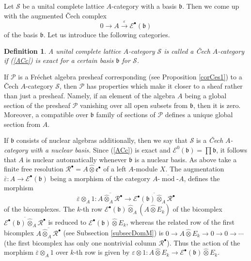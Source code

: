 \documentclass[12pt]{amsart}%
\theoremstyle{plain}
\newtheorem{definition}{Definition}
\numberwithin{equation}{section}
\numberwithin{equation}{section}
\numberwithin{theorem}{section}
\numberwithin{lemma}{section}
\numberwithin{remark}{section}
\numberwithin{example}{section}
\numberwithin{proposition}{section}
\numberwithin{definition}{section}
\numberwithin{corollary}{section}
\begin{document}
Let $\mathcal{S}$ be a unital complete lattice $A$-category with a basis
$\mathfrak{b}$. Then we come up with the augmented \v{C}ech complex
\begin{equation}
0\rightarrow A\overset{\varepsilon}{\longrightarrow}\mathcal{E}^{\bullet
}\left(  \mathfrak{b}\right)  \label{ACc}%
\end{equation}
of the basis $\mathfrak{b}$. Let us introduce the following categories.

\begin{definition}
\label{defCech}A unital complete lattice $A$-category $\mathcal{S}$ is called
\textit{a \v{C}ech }$A$-\textit{category if (\ref{ACc}) is exact for a certain
}basis $\mathfrak{b}$ for $\mathcal{S}$.
\end{definition}

If $\mathcal{P}$ is a Fr\'{e}chet algebra presheaf corresponding (see
Proposition \ref{corCes1}) to a \v{C}ech $A$-category $\mathcal{S}$, then
$\mathcal{P}$ has properties which make it closer to a sheaf rather than just
a presheaf. Namely, if an element of the algebra $A$ being a global section of
the presheaf $\mathcal{P}$ vanishing over all open subsets from $\mathfrak{b}%
$, then it is zero. Moreover, a compatible over $\mathfrak{b}$ family of
sections of $\mathcal{P}$ defines a unique global section from $A$.

If $\mathfrak{b}$ consists of nuclear algebras additionally, then we say that
$\mathcal{S}$ is a\textit{ \v{C}ech }$A$\textit{-category with a nuclear
basis. }Since (\ref{ACc}) is exact and $\mathcal{E}^{0}\left(  \mathfrak{b}%
\right)  =\prod\mathfrak{b}$, it follows that $A$ is nuclear automatically
whenever $\mathfrak{b}$ is a nuclear basis. As above take a finite free
resolution $\mathcal{R}^{\bullet}\mathcal{=}A\widehat{\otimes}\mathfrak{e}%
^{\bullet}$ of a left $A$-module $X$. The augmentation $\overline{\varepsilon
}:A\rightarrow\mathcal{E}^{\bullet}\left(  \mathfrak{b}\right)  $ being a
morphism of the category $\overline{A\text{-}\operatorname*{mod}\text{-}A}$,
defines the morphism
\begin{equation}
\overline{\varepsilon}\otimes_{A}1:\overline{A\widehat{\otimes}_{A}%
\mathcal{R}^{\bullet}}\longrightarrow\overline{\mathcal{E}^{\bullet}\left(
\mathfrak{b}\right)  \widehat{\otimes}_{A}\mathcal{R}^{\bullet}} \label{Epst1}%
\end{equation}
of the bicomplexes. The $k$-th row $\mathcal{E}^{\bullet}\left(
\mathfrak{b}\right)  \widehat{\otimes}_{A}\left(  A\widehat{\otimes}%
E_{k}\right)  $ of the bicomplex $\overline{\mathcal{E}^{\bullet}\left(
\mathfrak{b}\right)  \widehat{\otimes}_{A}\mathcal{R}^{\bullet}}$ is reduced
to $\mathcal{E}^{\bullet}\left(  \mathfrak{b}\right)  \widehat{\otimes}E_{k}$,
whereas the related row of the first bicomplex $\overline{A\widehat{\otimes
}_{A}\mathcal{R}^{\bullet}}$ (see Subsection \ref{subsecDomM}) is
$0\rightarrow A\widehat{\otimes}E_{k}\rightarrow0\rightarrow0\rightarrow
\cdots$ (the first bicomplex has only one nontrivial column $\mathcal{R}%
^{\bullet}$). Thus the action of the morphism $\overline{\varepsilon}%
\otimes_{A}1$ over $k$-th row is given by $\varepsilon\otimes
1:A\widehat{\otimes}E_{k}\rightarrow\mathcal{E}^{\bullet}\left(
\mathfrak{b}\right)  \widehat{\otimes}E_{k}$.
\end{document}
